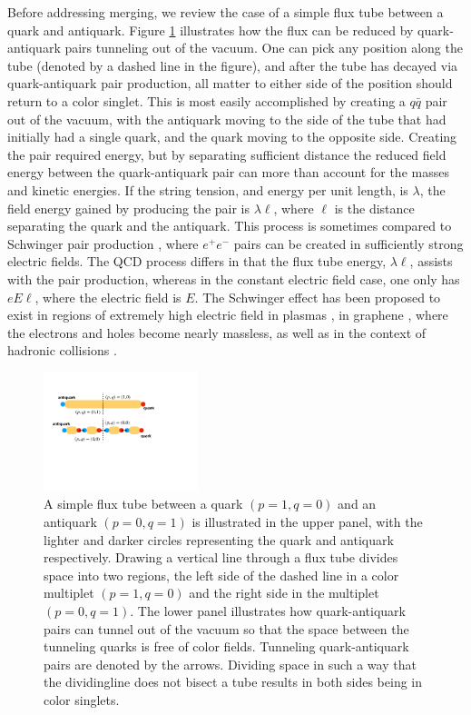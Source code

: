 \documentclass[aps, prc, 12pt, nofootinbib, showpacs, superscriptaddress, tightenlines, groupedaddress]{revtex4-2}
\begin{document}
Before addressing merging, we review the case of a simple flux tube between a quark and antiquark. Figure \ref{fig:simpletube} illustrates how the flux can be reduced by quark-antiquark pairs tunneling out of the vacuum. One can pick any position along the tube (denoted by a dashed line in the figure), and after the tube has decayed via quark-antiquark pair production, all matter to either side of the position should return to a color singlet. This is most easily accomplished by creating a $q\bar{q}$ pair out of the vacuum, with the antiquark moving to the side of the tube that had initially had a single quark, and the quark moving to the opposite side. Creating the pair required energy, but by separating sufficient distance the reduced field energy between the quark-antiquark pair can more than account for the masses and kinetic energies. If the string tension, and energy per unit length, is $\lambda$, the field energy gained by producing the pair is $\lambda \ell$, where $\ell$ is the distance separating the quark and the antiquark. This process is sometimes compared to Schwinger pair production \cite{Schwinger}, where $e^+e^-$ pairs can be created in sufficiently strong electric fields. The QCD process differs in that the flux tube energy, $\lambda\ell$, assists with the pair production, whereas in the constant electric field case, one only has $eE\ell$, where the electric field is $E$. The Schwinger effect has been proposed to exist in regions of extremely high electric field in plasmas \cite{Schwinger_plasma}, in graphene \cite{Schwinger_graphene}, where the electrons and holes become nearly massless, as well as in the context of hadronic collisions \cite{Wong:1994ei,Suganuma:1991ha}.
\begin{figure}
\centerline{\includegraphics[width=0.4\textwidth]{figs/simpletube.pdf}}
\caption{\label{fig:simpletube}
A simple flux tube between a quark $(p=1,q=0)$ and an antiquark $(p=0,q=1)$ is illustrated in the upper panel, with the lighter and darker circles representing the quark and antiquark respectively. Drawing a vertical line through a flux tube divides space into two regions, the left side of the dashed line in a color multiplet $(p=1,q=0)$ and the right side in the multiplet $(p=0,q=1)$. The lower panel illustrates how quark-antiquark pairs can tunnel out of the vacuum so that the space between the tunneling quarks is free of color fields. Tunneling quark-antiquark pairs are denoted by the arrows.  Dividing space in such a way that the dividingline does not bisect a tube results in both sides being in color singlets.
}
\end{figure}
\end{document}

